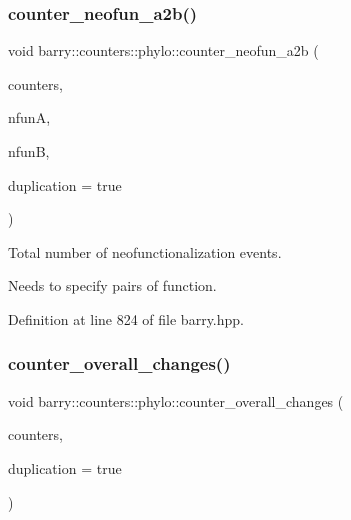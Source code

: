 \subsubsection{\texorpdfstring{counter\+\_\+neofun\+\_\+a2b()}{counter\_neofun\_a2b()}}
{\footnotesize\ttfamily void barry\+::counters\+::phylo\+::counter\+\_\+neofun\+\_\+a2b (\begin{DoxyParamCaption}\item[{\hyperlink{namespacebarry_1_1counters_1_1phylo_a4e401ffe66d04091343dcffaf915f8c3}{Phylo\+Counters} $\ast$}]{counters,  }\item[{\hyperlink{namespacebarry_a11dfc53ddb4672278319aa04f1e09a6c}{uint}}]{nfunA,  }\item[{\hyperlink{namespacebarry_a11dfc53ddb4672278319aa04f1e09a6c}{uint}}]{nfunB,  }\item[{bool}]{duplication = {\ttfamily true} }\end{DoxyParamCaption})\hspace{0.3cm}{\ttfamily [inline]}}



Total number of neofunctionalization events. 

Needs to specify pairs of function. 

Definition at line 824 of file barry.\+hpp.

\mbox{\label{namespacebarry_1_1counters_1_1phylo_abeaaaa150b98e55f7bc242810fa1230a}} 
\subsubsection{\texorpdfstring{counter\+\_\+overall\+\_\+changes()}{counter\_overall\_changes()}}
{\footnotesize\ttfamily void barry\+::counters\+::phylo\+::counter\+\_\+overall\+\_\+changes (\begin{DoxyParamCaption}\item[{\hyperlink{namespacebarry_1_1counters_1_1phylo_a4e401ffe66d04091343dcffaf915f8c3}{Phylo\+Counters} $\ast$}]{counters,  }\item[{bool}]{duplication = {\ttfamily true} }\end{DoxyParamCaption})\hspace{0.3cm}{\ttfamily [inline]}}



